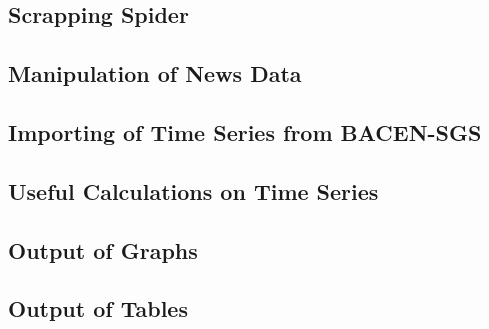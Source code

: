 \documentclass[cic,tc, english]{iiufrgs}
\begin{document}
\subsection{Scrapping Spider}

    
    
\subsection{Manipulation of News Data}

    

\subsection{Importing of Time Series from BACEN-SGS}

    

\subsection{Useful Calculations on Time Series}

    

\subsection{Output of Graphs}

    

\subsection{Output of Tables}

    


 \label{chapter_bibliography}
\end{document}
